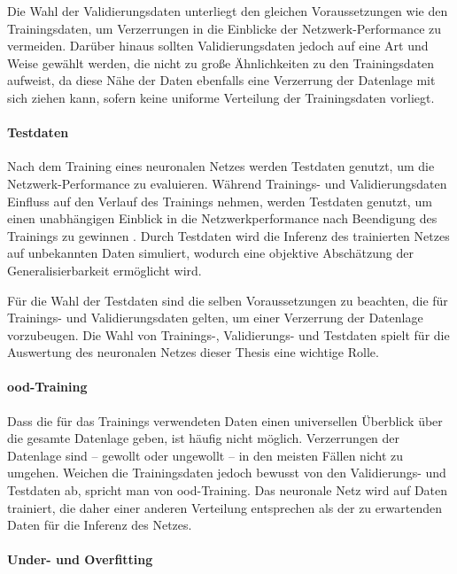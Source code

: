 Die Wahl der Validierungsdaten unterliegt den gleichen Voraussetzungen wie den Trainingsdaten, um Verzerrungen in die Einblicke der Netzwerk-Performance zu vermeiden. Darüber hinaus sollten Validierungsdaten jedoch auf eine Art und Weise gewählt werden, die nicht zu große Ähnlichkeiten zu den Trainingsdaten aufweist, da diese Nähe der Daten ebenfalls eine Verzerrung der Datenlage mit sich ziehen kann, sofern keine uniforme Verteilung der Trainingsdaten vorliegt.

\paragraph{Testdaten}

Nach dem Training eines neuronalen Netzes werden Testdaten genutzt, um die Netzwerk-Performance zu evaluieren. Während Trainings- und Validierungsdaten Einfluss auf den Verlauf des Trainings nehmen, werden Testdaten genutzt, um einen unabhängigen Einblick in die Netzwerkperformance nach Beendigung des Trainings zu gewinnen \cite{nn_terminology}. Durch Testdaten wird die Inferenz des trainierten Netzes auf unbekannten Daten simuliert, wodurch eine objektive Abschätzung der Generalisierbarkeit ermöglicht wird.

Für die Wahl der Testdaten sind die selben Voraussetzungen zu beachten, die für Trainings- und Validierungsdaten gelten, um einer Verzerrung der Datenlage vorzubeugen. Die Wahl von Trainings-, Validierungs- und Testdaten spielt für die Auswertung des neuronalen Netzes dieser Thesis eine wichtige Rolle.

\paragraph{\Acl{ood}-Training}

Dass die für das Trainings verwendeten Daten einen universellen Überblick über die gesamte Datenlage geben, ist häufig nicht möglich. Verzerrungen der Datenlage sind -- gewollt oder ungewollt -- in den meisten Fällen nicht zu umgehen. Weichen die Trainingsdaten jedoch bewusst von den Validierungs- und Testdaten ab, spricht man von \Acf{ood}-Training. Das neuronale Netz wird auf Daten trainiert, die daher einer anderen Verteilung entsprechen als der zu erwartenden Daten für die Inferenz des Netzes.

\paragraph{Under- und Overfitting}

